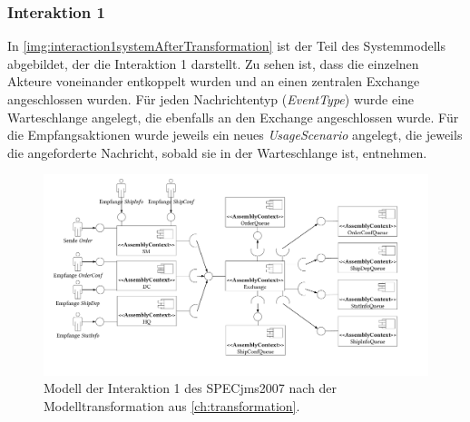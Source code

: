 \subsubsection{Interaktion 1}
In \autoref{img:interaction1systemAfterTransformation} ist der Teil des Systemmodells abgebildet, der die Interaktion 1 darstellt. Zu sehen ist, dass die einzelnen Akteure voneinander entkoppelt wurden und an einen zentralen Exchange angeschlossen wurden. Für jeden Nachrichtentyp (\emph{EventType}) wurde eine Warteschlange angelegt, die ebenfalls an den Exchange angeschlossen wurde. Für die Empfangsaktionen wurde jeweils ein neues \emph{UsageScenario} angelegt, die jeweils die angeforderte Nachricht, sobald sie in der Warteschlange ist, entnehmen. 
\begin{figure}
\center
  \includegraphics[width=1.4\textwidth,angle=90]{images/evaluation/specjms/evaluationInteraktion1new.pdf}
  \caption{Modell der Interaktion 1 des SPECjms2007 nach der Modelltransformation aus \autoref{ch:transformation}.}
  \label{img:interaction1systemAfterTransformation}
\end{figure}
